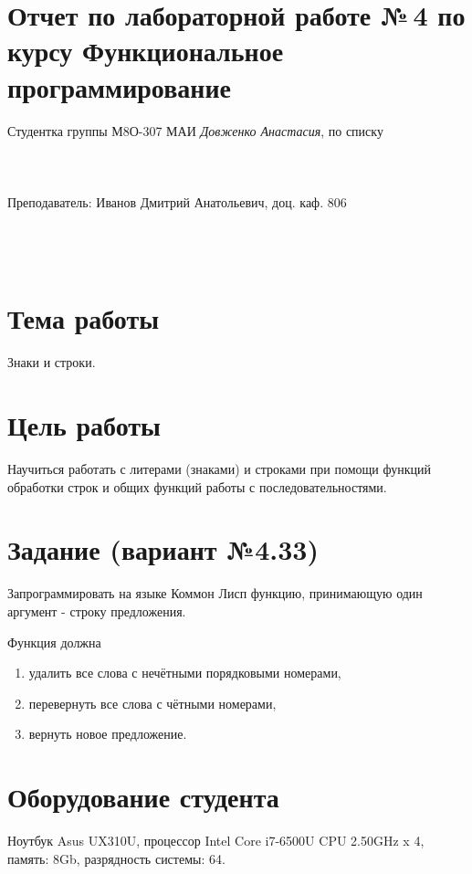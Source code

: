 \documentclass[12pt]{article}
\begin{document}
\section*{Отчет по лабораторной работе №\,4
по курсу \guillemotleft  Функциональное программирование\guillemotright}
\begin{flushright}
Студентка группы М8О-307 МАИ \textit{Довженко Анастасия},  по списку \\
 \\
 \\
\ \\
Преподаватель: Иванов Дмитрий Анатольевич, доц. каф. 806 \\
 \\
 \\
 \\

\end{flushright}

\section{Тема работы}
Знаки и строки.

\section{Цель работы}
Научиться работать с литерами (знаками) и строками при помощи функций обработки строк и общих функций работы с последовательностями.

\section{Задание (вариант №4.33)}
Запрограммировать на языке Коммон Лисп функцию, принимающую один аргумент - строку предложения.

Функция должна
\begin{enumerate}
\item удалить все слова с нечётными порядковыми номерами,
\item перевернуть все слова с чётными номерами,
\item вернуть новое предложение.
\end{enumerate}

\section{Оборудование студента}
Ноутбук Asus UX310U, процессор Intel Core i7-6500U CPU 2.50GHz x 4, память: 8Gb, разрядность системы: 64.
\end{document}
